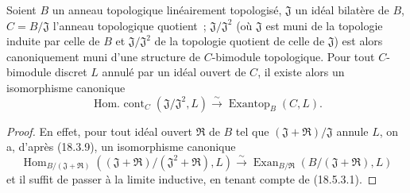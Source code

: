 \begin{proposition}[18.5.4]
\label{0.18.5.4-fr}
Soient $B$ un anneau topologique linéairement topologisé, $\mathfrak J$ un
idéal bilatère de $B$, $C=B/\mathfrak J$ l'anneau topologique quotient~;
$\mathfrak J/\mathfrak J^2$ (où $\mathfrak J$ est muni de la topologie induite
par celle de $B$ et $\mathfrak J/\mathfrak J^2$ de la topologie quotient de
celle de $\mathfrak J$) est alors canoniquement muni d'une structure de
$C$-bimodule topologique. Pour tout $C$-bimodule discret $L$ annulé par un
idéal ouvert de $C$, il existe alors un isomorphisme canonique
\begin{equation}
\label{0.18.5.4.1-fr}
\tag{18.5.4.1}
  \operatorname{Hom.\ cont}_C(\mathfrak J/\mathfrak J^2,L)
  \xrightarrow{\sim}\operatorname{Exantop}_B(C,L).
\end{equation}
\end{proposition}

\begin{proof}
En effet, pour tout idéal ouvert $\mathfrak R$ de $B$ tel que
$(\mathfrak J+\mathfrak R)/\mathfrak J$ annule $L$, on a, d'après (18.3.9),
un isomorphisme canonique
\[
  \operatorname{Hom}_{B/(\mathfrak J+\mathfrak R)}
    ((\mathfrak J+\mathfrak R)/(\mathfrak J^2+\mathfrak R),L)
  \xrightarrow{\sim}
  \operatorname{Exan}_{B/\mathfrak R}(B/(\mathfrak J+\mathfrak R),L)
\]
et il suffit de passer à la limite inductive, en tenant compte de (18.5.3.1).
\end{proof}
